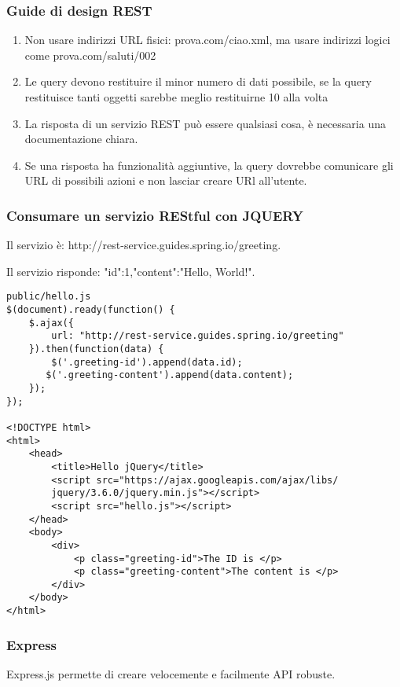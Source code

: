 \subsubsection{Guide di design REST}
\begin{enumerate}
    \item Non usare indirizzi URL fisici: prova.com/ciao.xml, ma usare indirizzi logici come prova.com/saluti/002
    \item Le query devono restituire il minor numero di dati possibile, se la query restituisce tanti oggetti sarebbe meglio restituirne 10 alla volta
    \item La risposta di un servizio REST può essere qualsiasi cosa, è necessaria una documentazione chiara.
    \item Se una risposta ha funzionalità aggiuntive, la query dovrebbe comunicare gli URL di possibili azioni e non lasciar creare URl all'utente.
\end{enumerate}

\subsubsection{Consumare un servizio REStful con JQUERY}
Il servizio è: http://rest-service.guides.spring.io/greeting.


Il servizio risponde: {"id":1,"content":"Hello, World!"}.

\begin{lstlisting}
public/hello.js
$(document).ready(function() {
    $.ajax({
        url: "http://rest-service.guides.spring.io/greeting"
    }).then(function(data) {
        $('.greeting-id').append(data.id);
       $('.greeting-content').append(data.content);
    });
});

<!DOCTYPE html>
<html>
    <head>
        <title>Hello jQuery</title>
        <script src="https://ajax.googleapis.com/ajax/libs/
        jquery/3.6.0/jquery.min.js"></script>
        <script src="hello.js"></script>
    </head>
    <body>
        <div>
            <p class="greeting-id">The ID is </p>
            <p class="greeting-content">The content is </p>
        </div>
    </body>
</html>
\end{lstlisting}

\subsubsection{Express}
Express.js permette di creare velocemente e facilmente API robuste.